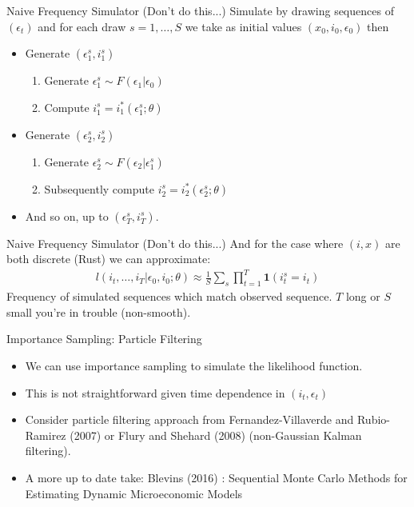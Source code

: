 \documentclass[xcolor=pdftex,dvipsnames,table,mathserif,aspectratio=169]{beamer}
\begin{document}
\begin{frame}{Naive Frequency Simulator (Don't do this...)}
Simulate by drawing sequences of $(\epsilon_t)$ and for each draw $s=1,\ldots,S$ we take as initial values $(x_0,i_0,\epsilon_0)$ then
\begin{itemize}
\item Generate $(\epsilon_1^s, i_1^s)$
	\begin{enumerate}
	\item Generate $\epsilon_1^s \sim F(\epsilon_1 | \epsilon_0)$ 
	\item Compute $i_1^s = i_1^{*}(\epsilon_1^s; \theta)$
	\end{enumerate}
\item Generate $(\epsilon_2^s, i_2^s)$
	\begin{enumerate}
	\item Generate $\epsilon_2^s \sim F(\epsilon_2 | \epsilon_1^s)$ 
	\item Subsequently compute $i_2^s = i_2^{*}(\epsilon_2^s; \theta)$
	\end{enumerate}
\item And so on, up to $(\epsilon_T^s,i_T^s)$.
\end{itemize}
\end{frame}


\begin{frame}{Naive Frequency Simulator (Don't do this...)}
And for the case where $(i,x)$ are both discrete (Rust) we can approximate:
\vspace{-0.5cm}
\begin{eqnarray*}
l(i_t,\ldots,i_T | \epsilon_0,i_0;\theta) \approx \frac{1}{S} \sum_s \prod_{t=1}^T \mathbf{1}(i_t^s = i_t)
\end{eqnarray*}
Frequency of simulated sequences which match observed sequence.  $T$ long or $S$ small you're in trouble (non-smooth).
\end{frame}



\begin{frame}{Importance Sampling: Particle Filtering}
\begin{itemize}
\item We can use importance sampling to simulate the likelihood function. 
\item This is not straightforward given time dependence in $(i_t,\epsilon_t)$
\item Consider particle filtering approach from Fernandez-Villaverde and Rubio-Ramirez (2007) or Flury and Shehard (2008) (non-Gaussian Kalman filtering).
\item A more up to date take: Blevins (2016) : Sequential {Monte Carlo} Methods for Estimating Dynamic Microeconomic Models
\end{itemize}
\end{frame}
\end{document}
